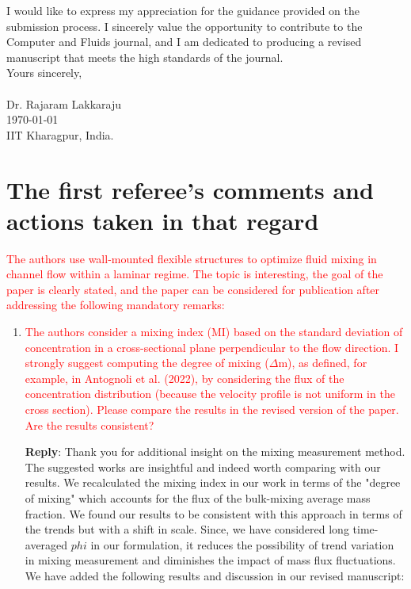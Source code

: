 \documentclass[onecolumn,a4paper,amsmath,amssym,pre]{revtex4}
\begin{document}
{{	  I would like to express my appreciation for the guidance provided on the submission process. I sincerely value the opportunity to contribute to the Computer and Fluids journal, and I am dedicated to producing a revised manuscript that meets the high standards of the journal.}\\
	  
	  \vspace{1cm} 
	  Yours sincerely, \\
	  \vspace{0.1cm} \\
	  Dr. Rajaram Lakkaraju \\
	  \today \\
	  IIT Kharagpur, India.
	
\newpage

\section*{\textbf{The first referee's comments and actions taken in that regard}}

\textcolor{red}{The authors use wall-mounted flexible structures to optimize fluid mixing in channel flow within a laminar regime. The topic is interesting, the goal of the paper is clearly stated, and the paper can be considered for publication after addressing the following mandatory remarks:}

\begin{enumerate}	
	
	\item \textcolor{red}{The authors consider a mixing index (MI) based on the standard deviation of concentration in a cross-sectional plane perpendicular to the flow direction. I strongly suggest computing the degree of mixing ($\Delta$m), as defined, for example, in Antognoli et al. (2022), by considering the flux of the concentration distribution (because the velocity profile is not uniform in the cross section). Please compare the results in the revised version of the paper. Are the results consistent?}
	
\textbf{Reply}: Thank you for additional insight on the mixing measurement method. The suggested works are insightful and indeed worth comparing with our results. We recalculated the mixing index in our work in terms of the "degree of mixing" which accounts for the flux of the bulk-mixing average mass fraction. We found our results to be consistent with this approach in terms of the trends but with a shift in scale. Since, we have considered long time-averaged $phi$ in our formulation, it reduces the possibility of trend variation in mixing measurement and diminishes the impact of mass flux fluctuations. We have added the following results and discussion in our revised manuscript:


\end{enumerate}}
\end{document}
